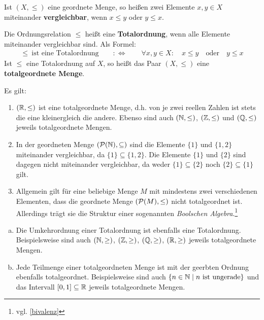 \begin{defin}[Vergleichbarkeit] \label{def:totalordnung}  
    Ist $(X,\le)$ eine geordnete Menge, so heißen zwei Elemente $x,y\in X$ miteinander \textbf{vergleichbar}, wenn $x\le y$ oder $y\le x$.

    Die Ordnungsrelation $\le$ heißt eine \textbf{Totalordnung}, wenn alle Elemente miteinander vergleichbar sind. Als Formel:
    \begin{align*}
        \le\ \text{ist eine Totalordnung}\qquad:\Leftrightarrow\qquad \forall x,y \in X:\quad x\le y\quad \text{oder}\quad y\le x 
    \end{align*}
    Ist $\le$ eine Totalordnung auf $X$, so heißt das Paar $(X,\le)$ eine \textbf{totalgeordnete Menge}.
\end{defin}


\begin{bsp}
    Es gilt:
    \begin{enumerate}
        \item $(\mathbb R,\le)$ ist eine totalgeordnete Menge, d.h. von je zwei reellen Zahlen ist stets die eine kleinergleich die andere. Ebenso sind auch $(\mathbb N,\le)$, $(\mathbb Z,\le)$ und $(\mathbb Q,\le)$ jeweils totalgeordnete Mengen.
        \item In der geordneten Menge $(\mathcal P(\mathbb N),\subseteq)$ sind die Elemente $\{1\}$ und $\{1,2\}$ miteinander vergleichbar, da $\{1\}\subseteq \{1,2\}$. Die Elemente $\{1\}$ und $\{2\}$ sind dagegen nicht miteinander vergleichbar, da weder $\{1\}\subseteq\{2\}$ noch $\{2\}\subseteq \{1\}$ gilt.
        \item Allgemein gilt für eine beliebige Menge $M$ mit mindestens zwei verschiedenen Elementen, dass die geordnete Menge $(\mathcal P(M),\le)$ nicht totalgeordnet ist. Allerdings trägt sie die Struktur einer sogenannten \emph{Boolschen Algebra}.\footnote{vgl. \cref{bivalenz}}
    \end{enumerate}
\end{bsp}


\begin{bem} \quad
    \begin{enumerate}[a)]
        \item Die Umkehrordnung einer Totalordnung ist ebenfalls eine Totalordnung. Beispielsweise sind auch $(\mathbb N,\ge)$, $(\mathbb Z,\ge)$, $(\mathbb Q,\ge)$, $(\mathbb R,\ge)$ jeweils totalgeordnete Mengen.
        \item Jede Teilmenge einer totalgeordneten Menge ist mit der geerbten Ordnung ebenfalls totalgeordnet. Beispielsweise sind auch $\{n\in \mathbb N\mid n\ \text{ist ungerade}\}$ und das Intervall $[0,1]\subseteq\mathbb R$ jeweils totalgeordnete Mengen.
    \end{enumerate}
\end{bem}



